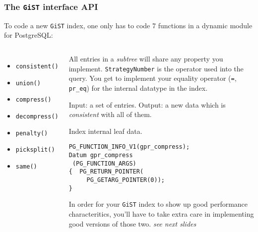 \documentclass{beamer}
\begin{document}
\begin{frame}[fragile]
  \frametitle{The \texttt{GiST} interface API}

  To code a new \texttt{GiST} index, one only has to code 7 functions in a
  dynamic module for PostgreSQL:

\begin{columns}[c]

  \begin{itemize}
   \item<1,5-> \texttt{consistent()}
   \item<2,5-> \texttt{union()}
   \item<3,5-> \texttt{compress()}
   \item<3,5-> \texttt{decompress()}
   \item<4,5-> \texttt{penalty()}
   \item<4,5-> \texttt{picksplit()}
   \item<1,5-> \texttt{same()}
  \end{itemize}


  \begin{overprint}


  All entries in a \textit{subtree} will share any property you
  implement.
  \linebreak
  \texttt{StrategyNumber} is the operator used into the query.
  \linebreak
  \linebreak
  You get to implement your equality operator (\texttt{=},
  \texttt{pr\_eq}) for the internal datatype in the index.


  Input: a set of entries. 
  \linebreak
  \linebreak
  Output: a new data which is \textit{consistent} with all of them.

  Index internal leaf data.
  \begin{example}
  \begin{verbatim}
PG_FUNCTION_INFO_V1(gpr_compress);
Datum gpr_compress
 (PG_FUNCTION_ARGS) 
{  PG_RETURN_POINTER(
     PG_GETARG_POINTER(0));
} \end{verbatim}
  \end{example}

  In order for your \texttt{GiST} index to show up good performance
  characteritics, you'll have to take extra care in implementing good
  versions of those two.
  \linebreak
  \linebreak
  \textit{see next slides}


\end{overprint}
\end{columns}
\end{frame}
\end{document}
